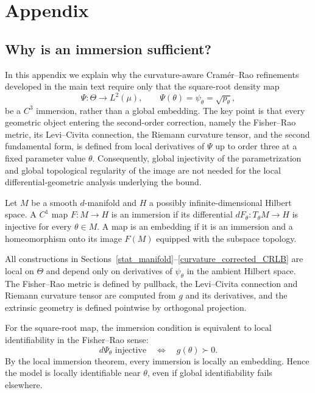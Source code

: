 \documentclass[11pt,letterpaper]{amsart}
\numberwithin{equation}{section}
\theoremstyle{plain}
\theoremstyle{definition}
\theoremstyle{remark}
\begin{document}
\section{Appendix}\label{appendix}
\subsection{Why is an immersion sufficient?}
\label{app:immersion_vs_embedding}

In this appendix we explain why the curvature-aware Cram\'er--Rao refinements developed in the main text require only that the square-root density map
\begin{equation*}
\Psi:\Theta\to L^2(\mu),\qquad \Psi(\theta)=\psi_\theta=\sqrt{p_\theta},
\end{equation*}
be a $C^3$ immersion, rather than a global embedding. The key point is that every geometric object entering the second-order correction, namely the Fisher--Rao metric, its Levi--Civita connection, the Riemann curvature tensor, and the second fundamental form, is defined from local derivatives of $\Psi$ up to order three at a fixed parameter value $\theta$. Consequently, global injectivity of the parametrization and global topological regularity of the image are not needed for the local differential-geometric analysis underlying the bound.

Let $M$ be a smooth $d$-manifold and $H$ a possibly infinite-dimensional Hilbert space. A $C^1$ map $F:M\to H$ is an immersion if its differential $dF_\theta:T_\theta M\to H$ is injective for every $\theta\in M$. A map is an embedding if it is an immersion and a homeomorphism onto its image $F(M)$ equipped with the subspace topology.

All constructions in Sections~\ref{stat_manifold}--\ref{curvature_corrected_CRLB} are local on $\Theta$ and depend only on derivatives of $\psi_\theta$ in the ambient Hilbert space. The Fisher--Rao metric is defined by pullback, the Levi--Civita connection and Riemann curvature tensor are computed from $g$ and its derivatives, and the extrinsic geometry is defined pointwise by orthogonal projection.

For the square-root map, the immersion condition is equivalent to local identifiability in the Fisher--Rao sense:
\begin{equation*}
d\Psi_\theta \text{ injective}
\quad\Longleftrightarrow\quad
g(\theta)\succ 0.
\end{equation*}
By the local immersion theorem, every immersion is locally an embedding. Hence the model is locally identifiable near $\theta$, even if global identifiability fails elsewhere.
\end{document}
